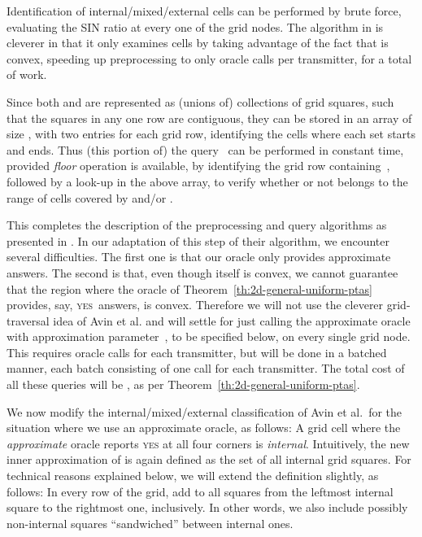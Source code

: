\documentclass[11pt]{article}
\theoremstyle{remark}
\begin{document}
\begin{enumerate}[(i)]
Identification of internal/mixed/external cells can be performed by brute force, evaluating the SIN ratio at every one of the  grid nodes.  The algorithm in \cite{aeklpr-sdciawn-12} is cleverer in that it only examines  cells by taking advantage of the fact that  is convex, speeding up preprocessing to only  oracle calls per transmitter, for a total of  work.

Since both  and  are represented as (unions of) collections of grid squares, such that the squares in any one row are contiguous, they can be stored in an array of size , with two entries for each grid row, identifying the cells where each set starts and ends.  Thus (this portion of) the query~ can be performed in constant time, provided \emph{floor} operation is available, by identifying the grid row containing~, followed by a look-up in the above array, to verify whether or not  belongs to the range of cells covered by  and/or .

This completes the description of the preprocessing and query algorithms as presented in \cite{aeklpr-sdciawn-12}.
In our adaptation of this step of their algorithm, we encounter several difficulties.  The first one is that our oracle only provides approximate answers.  The second is that, even though  itself is convex, we cannot guarantee that the region where the oracle of Theorem~\ref{th:2d-general-uniform-ptas} provides, say, \textsc{yes}~answers, is convex.
Therefore we will not use the cleverer grid-traversal idea of Avin et al. \cite{aeklpr-sdciawn-12} and will settle for just calling the approximate oracle with approximation parameter~, to be specified below, on every single grid node.  This requires  oracle calls for each transmitter, but will be done in a batched manner, each batch consisting of one call for each transmitter. 
The total cost of all these queries will be , as per Theorem~\ref{th:2d-general-uniform-ptas}.


We now modify the internal/mixed/external classification of Avin et al.\ for the situation where we use an approximate oracle, as follows:
A grid cell where the \emph{approximate} oracle reports \textsc{yes} at all four corners is \emph{internal}.  Intuitively, the new inner approximation  of  is again defined as the set of all internal grid squares.  For technical reasons explained below, we will extend the definition slightly, as follows:  In every row of the grid, add to  all squares from the leftmost internal square to the rightmost one, inclusively.  In other words, we also include possibly non-internal squares ``sandwiched'' between internal ones.


\end{enumerate}
\end{document}
